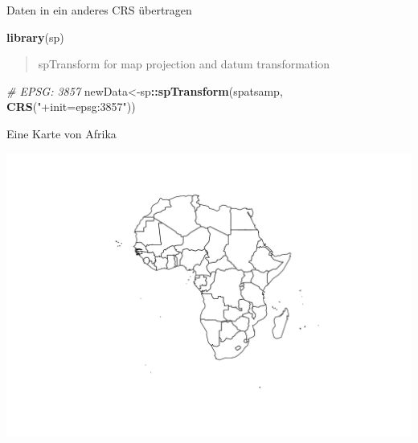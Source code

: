 \documentclass[ignorenonframetext,]{beamer}
\newenvironment{Shaded}{\begin{snugshade}}{\end{snugshade}}
\newcommand{\CommentTok}[1]{\textcolor[rgb]{0.56,0.35,0.01}{\textit{#1}}}
\newcommand{\DecValTok}[1]{\textcolor[rgb]{0.00,0.00,0.81}{#1}}
\newcommand{\KeywordTok}[1]{\textcolor[rgb]{0.13,0.29,0.53}{\textbf{#1}}}
\newcommand{\NormalTok}[1]{#1}
\newcommand{\OperatorTok}[1]{\textcolor[rgb]{0.81,0.36,0.00}{\textbf{#1}}}
\newcommand{\StringTok}[1]{\textcolor[rgb]{0.31,0.60,0.02}{#1}}
\begin{document}
\begin{frame}[fragile]{Daten in ein anderes CRS übertragen}
\protect\hypertarget{daten-in-ein-anderes-crs-ubertragen}{}

\begin{Shaded}
\begin{Highlighting}[]
\KeywordTok{library}\NormalTok{(sp)}
\end{Highlighting}
\end{Shaded}

\begin{quote}
spTransform for map projection and datum transformation
\end{quote}

\begin{Shaded}
\begin{Highlighting}[]
\CommentTok{# EPSG: 3857}
\NormalTok{newData<-sp}\OperatorTok{::}\KeywordTok{spTransform}\NormalTok{(spatsamp, }\KeywordTok{CRS}\NormalTok{(}\StringTok{"+init=epsg:3857"}\NormalTok{))}
\end{Highlighting}
\end{Shaded}

\end{frame}

\begin{frame}[fragile]{Eine Karte von Afrika}
\protect\hypertarget{eine-karte-von-afrika}{}

\begin{Shaded}
\end{Shaded}

\includegraphics{A7_spdep_files/figure-beamer/unnamed-chunk-10-1.pdf}

\end{frame}
\end{document}
